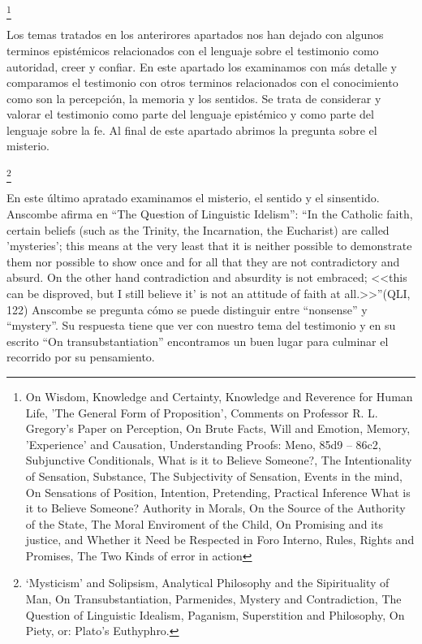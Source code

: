 \documentclass[11pt]{article}
\begin{document}
{\begin{spacing}{1.5}
\footnote{
On Wisdom, 
Knowledge and Certainty, 
Knowledge and Reverence for Human Life, 
'The General Form of Proposition', 
Comments on Professor R. L. Gregory's Paper on Perception, 
On Brute Facts, 
Will and Emotion, 
Memory, 'Experience' and Causation, 
Understanding Proofs: Meno, 85d9 – 86c2, 
Subjunctive Conditionals, 
What is it to Believe Someone?, 
The Intentionality of Sensation, 
Substance, 
The Subjectivity of Sensation, 
Events in the mind, 
On Sensations of Position, 
Intention, 
Pretending, 
Practical Inference
What is it to Believe Someone?
Authority in Morals, 
On the Source of the Authority of the State, 
The Moral Enviroment of the Child, 
On Promising and its justice, and Whether it Need be Respected in Foro Interno, 
Rules, Rights and Promises, 
The Two Kinds of error in action
}

\begin{spacing}{1}
Los temas tratados en los anterirores apartados nos han dejado con algunos terminos epistémicos relacionados con el lenguaje sobre el testimonio como autoridad, creer y confiar. En este apartado los examinamos con más detalle y comparamos el testimonio con otros terminos relacionados con el conocimiento como son la percepción, la memoria y los sentidos. Se trata de considerar y valorar el testimonio como parte del lenguaje epistémico y como parte del lenguaje sobre la fe. Al final de este apartado abrimos la pregunta sobre el misterio.
\end{spacing}

\footnote{
`Mysticism' and Solipsism, 
Analytical Philosophy and the Sipirituality of Man, 
On Transubstantiation, 
Parmenides, Mystery and Contradiction, 
The Question of Linguistic Idealism, 
Paganism, Superstition and Philosophy, 
On Piety, or: Plato's Euthyphro.
}

\begin{spacing}{1}
En este último apratado examinamos el misterio, el sentido y el sinsentido. Anscombe afirma en ``The Question of Linguistic Idelism'': ``In the Catholic faith, certain beliefs (such as the Trinity, the Incarnation, the Eucharist) are called 'mysteries'; this means at the very least that it is neither possible to demonstrate them nor possible to show once and for all that they are not contradictory and absurd. On the other hand contradiction and absurdity is not embraced; <<this can be disproved, but I still believe it' is not an attitude of faith at all.>>''(QLI, 122) Anscombe se pregunta cómo se puede distinguir entre ``nonsense'' y ``mystery''. Su respuesta tiene que ver con nuestro tema del testimonio y en su escrito ``On transubstantiation'' encontramos un buen lugar para culminar el recorrido por su pensamiento.
\end{spacing}


\end{spacing}}
\end{document}
